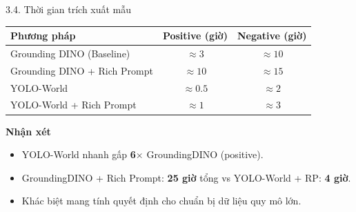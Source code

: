 \documentclass[11pt]{beamer}
\begin{document}

\begin{frame}{3.4. Thời gian trích xuất mẫu}
\scriptsize

\centering
\renewcommand{\arraystretch}{1.3}
\begin{tabular}{|l|c|c|}
\hline
\rowcolor{uitblue!15}
\textbf{Phương pháp} & \textbf{Positive (giờ)} & \textbf{Negative (giờ)} \\
\hline
Grounding DINO (Baseline) & $\approx 3$ & $\approx 10$ \\
\hline
Grounding DINO + Rich Prompt & $\approx 10$ & $\approx 15$ \\
\hline
\rowcolor{green!8} YOLO-World & $\approx 0.5$ & $\approx 2$ \\
\hline
\rowcolor{green!8} YOLO-World + Rich Prompt & $\approx 1$ & $\approx 3$ \\
\hline
\end{tabular}

\vspace{0.5em}

\begin{block}{\textbf{Nhận xét}}
\begin{itemize}
  \item YOLO-World nhanh gấp \textbf{6$\times$} GroundingDINO (positive).
  \item GroundingDINO + Rich Prompt: \textbf{25 giờ} tổng vs YOLO-World + RP: \textbf{4 giờ}.
  \item Khác biệt mang tính quyết định cho chuẩn bị dữ liệu quy mô lớn.
\end{itemize}
\end{block}

\end{frame}
\end{document}

